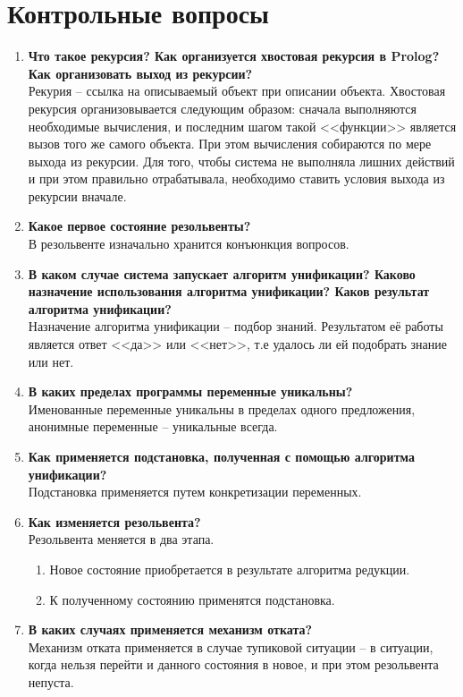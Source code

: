 \chapter{Контрольные вопросы}
\begin{enumerate}
	\item \textbf{Что такое рекурсия? Как организуется хвостовая рекурсия в Prolog? Как организовать выход из рекурсии?} \\
	Рекурия -- ссылка на описываемый объект при описании объекта. Хвостовая рекурсия организовывается следующим образом: сначала выполняются необходимые вычисления, и последним шагом такой <<функции>> является вызов того же самого объекта. При этом вычисления собираются по мере выхода из рекурсии. Для того, чтобы система не выполняла лишних действий и при этом правильно отрабатывала, необходимо ставить условия выхода из рекурсии вначале.
	
	\item \textbf{Какое первое состояние резольвенты?} \\	
	В резольвенте изначально хранится конъюнкция вопросов.
	
	\item \textbf{В каком случае система запускает алгоритм унификации? Каково назначение использования алгоритма унификации? Каков результат алгоритма унификации?} \\
	Назначение алгоритма унификации -- подбор знаний. Результатом её работы является ответ <<да>> или <<нет>>, т.е удалось ли ей подобрать знание или нет.
	
	\item \textbf{В каких пределах программы переменные уникальны?} \\
	Именованные переменные уникальны в пределах одного предложения, анонимные переменные -- уникальные всегда.
	
	\item \textbf{Как применяется подстановка, полученная с помощью алгоритма унификации?} \\
	Подстановка применяется путем конкретизации переменных.
	
	\item \textbf{Как изменяется резольвента?} \\
	Резольвента меняется в два этапа.
	\begin{enumerate}
		\item Новое состояние приобретается в результате алгоритма редукции. 
		\item К полученному состоянию применятся подстановка.
	\end{enumerate}

	\item \textbf{В каких случаях применяется механизм отката?} \\
	Механизм отката применяется в случае тупиковой ситуации -- в ситуации, когда нельзя перейти и данного состояния в новое, и при этом резольвента непуста.
\end{enumerate}